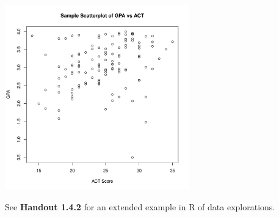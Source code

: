 \documentclass[12pt]{../notes}\usepackage[]{graphicx}\usepackage[]{color}
\newenvironment{knitrout}{}{} %
\begin{document}
\begin{itemize}
\begin{knitrout}
{\centering \includegraphics[width=0.6\textwidth]{figure/unnamed-chunk-4-1} 

}



\end{knitrout}


\end{itemize} %

\nspace
See \textbf{Handout 1.4.2} for an extended example in R of data explorations.

















\end{document}

